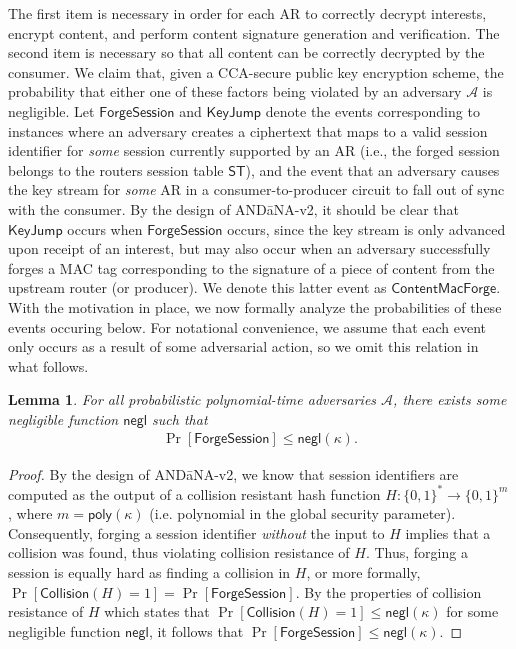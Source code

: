 \documentclass[10pt]{article}
\newtheorem{lemma}{\textbf{Lemma}}
\begin{document}
The first item is necessary in order for each AR to correctly decrypt interests, encrypt content, and perform content signature generation and verification. The second item is necessary so that all content can be correctly decrypted by the consumer. We claim that, given a CCA-secure public key encryption scheme, the probability that either one of these factors being violated by an adversary $\mathcal{A}$ is negligible. Let $\mathsf{ForgeSession}$ and $\mathsf{KeyJump}$ denote the events corresponding to instances where an adversary creates a ciphertext that maps to a valid session identifier for \emph{some} session currently supported by an AR (i.e., the forged session belongs to the routers session table $\mathsf{ST}$), and the event that an adversary causes the key stream for \emph{some} AR in a consumer-to-producer circuit to fall out of sync with the consumer. By the design of {\sf AND\=aNA-v2}, it should be clear that $\mathsf{KeyJump}$ occurs when $\mathsf{ForgeSession}$ occurs, since the key stream is only advanced upon receipt of an interest, but may also occur when an adversary successfully forges a MAC tag corresponding to the signature of a piece of content from the upstream router (or producer). We denote this latter event as $\mathsf{ContentMacForge}$. With the motivation in place, we now formally analyze the probabilities of these events occuring below. For notational convenience, we assume that each event only occurs as a result of some adversarial action, so we omit this relation in what follows.

\begin{lemma}
For all probabilistic polynomial-time adversaries $\mathcal{A}$, there exists some negligible function $\mathsf{negl}$ such that
\begin{align*}
\Pr[\mathsf{ForgeSession}] \leq \mathsf{negl}(\kappa).
\end{align*}
\end{lemma}
\begin{proof}
By the design of {\sf AND\=aNA-v2}, we know that session identifiers are computed as the output of a collision resistant hash function $H : \{0,1\}^* \to \{0,1\}^{m}$, where $m = \mathsf{poly}(\kappa)$ (i.e. polynomial in the global security parameter). Consequently, forging a session identifier \emph{without} the input to $H$ implies that a collision was found, thus violating collision resistance of $H$. Thus, forging a session is equally hard as finding a collision in $H$, or more formally, $\Pr[\mathsf{Collision}(H) = 1] = \Pr[\mathsf{ForgeSession}]$. By the properties of collision resistance of $H$ which states that $\Pr[\mathsf{Collision}(H) = 1] \leq \mathsf{negl}(\kappa)$ for some negligible function $\mathsf{negl}$, it follows that $\Pr[\mathsf{ForgeSession}] \leq \mathsf{negl}(\kappa)$. 

\end{proof}
\end{document}
